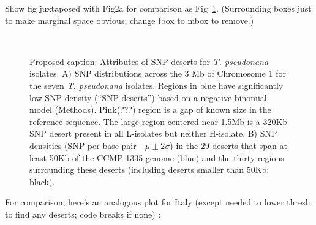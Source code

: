\documentclass{article}\usepackage[]{graphicx}\usepackage[]{color}
\begin{document}
Show fig juxtaposed with Fig2a for comparison as Fig~\ref{fig:2a2b}.  (Surrounding boxes just to make marginal space obvious; change fbox to mbox to remove.)
\begin{figure}
  \begin{center}
    \\
  \end{center}
  \caption{Proposed caption: Attributes of SNP deserts for {\it T. pseudonana\/} isolates. A) SNP distributions across the 3 Mb of Chromosome 1 for the seven {\it T. pseudonana\/} isolates. Regions in blue have significantly low SNP density (``SNP deserts'') based on a negative binomial model (Methods). Pink(???) region is a gap of known size in the reference sequence. The large region centered near 1.5Mb is a 320Kb SNP desert present in all L-isolates but neither H-isolate. B) SNP densities (SNP per base-pair---$\mu\pm2\sigma$) in the 29 deserts that span at least 50Kb of the CCMP 1335 genome (blue) and the thirty regions surrounding these deserts (including deserts smaller than 50Kb; black).  }
  \label{fig:2a2b}
\end{figure}

For comparison, here's an analogous plot for Italy (except needed to lower thresh to find any deserts; code breaks if none) :
\end{document}
